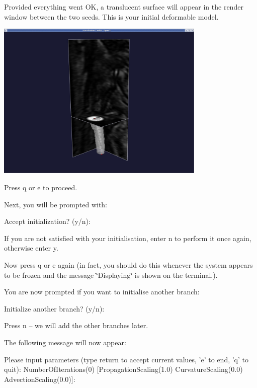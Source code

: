 Provided everything went OK, a translucent surface will appear in the render window between the two seeds. This is your initial deformable model.

 
\begin{DoxyImageNoCaption}
  \mbox{\includegraphics[width=0.75\textwidth]{deformable_model1}}
\end{DoxyImageNoCaption}


Press {\ttfamily q} or {\ttfamily e} to proceed.

Next, you will be prompted with\+: 
\begin{DoxyCode}
Accept initialization? (y/n):
\end{DoxyCode}


If you are not satisfied with your initialisation, enter {\ttfamily n} to perform it once again, otherwise enter {\ttfamily y}.

Now press {\ttfamily q} or {\ttfamily e} again (in fact, you should do this whenever the system appears to be frozen and the message \char`\"{}\+Displaying\char`\"{} is shown on the terminal.).

You are now prompted if you want to initialise another branch\+:


\begin{DoxyCode}
Initialize another branch? (y/n): 
\end{DoxyCode}


Press {\ttfamily n} -- we will add the other branches later.

The following message will now appear\+:


\begin{DoxyCode}
Please input parameters (type \textcolor{keywordflow}{return} to accept current values, \textcolor{charliteral}{'e'} to
end, \textcolor{charliteral}{'q'} to quit):
 NumberOfIterations(0) [PropagationScaling(1.0) CurvatureScaling(0.0) 
AdvectionScaling(0.0)]:
\end{DoxyCode}


